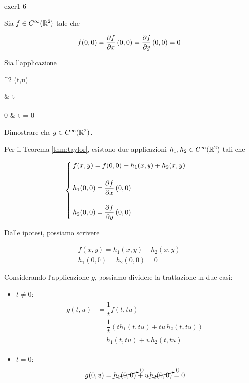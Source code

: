 {exer1-6}
{
Sia $ f \in C^{\infty} (\mathbb{R}^{2}) $ tale che

\begin{equation}
	f(0,0) = \pdv{f}{x} \, (0,0) = \pdv{f}{y} \, (0,0) = 0
\end{equation}

Sia l'applicazione

	{\R^{2}}{\R}
	{(t,u)}{%
			\begin{cases}
				 & t  \\ \\
				0 & t = 0
			\end{cases}
			}

Dimostrare che $ g \in C^{\infty}(\mathbb{R}^{2}) $.
}
{
Per il Teorema \ref{thm:taylor}, esistono due applicazioni $ h_{1},h_{2} \in C^{\infty}(\mathbb{R}^{2}) $ tali che

\begin{equation}
	\begin{cases}
		f(x,y) = f(0,0) + h_{1}(x,y) + h_{2}(x,y) \\\\
		h_{1}(0,0) = \dpdv{f}{x} \, (0,0) \\\\
		h_{2}(0,0) = \dpdv{f}{y} \, (0,0)
	\end{cases}
\end{equation}

Dalle ipotesi, possiamo scrivere

\begin{gather}
	f(x,y) = h_{1}(x,y) + h_{2}(x,y) \\
	 h_{1}(0,0) = h_{2}(0,0) = 0
\end{gather}

Considerando l'applicazione $ g $, possiamo dividere la trattazione in due casi:

\begin{itemize}
	\item $ t \neq 0 $:
	\begin{align}
		\begin{split}
			g(t,u) &= \dfrac{1}{t} f(t,tu) \\
			&= \dfrac{1}{t} ( t h_{1}(t,tu) + t u \, h_{2}(t,tu) ) \\
			&= h_{1}(t,tu) + u \, h_{2}(t,tu)
		\end{split}
	\end{align}

	\item $ t = 0 $:
	\begin{equation}
		g(0,u) = \cancelto{0}{h_{1}(0,0)} + u \, \cancelto{0}{h_{2}(0,0)} = 0
	\end{equation}
\end{itemize}

}
